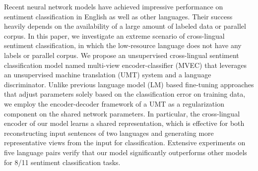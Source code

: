 Recent neural network models have achieved impressive performance on sentiment classification in English as well as other languages. Their success heavily depends on the availability of a large amount of labeled data or parallel corpus. In this paper, we investigate an extreme scenario of cross-lingual sentiment classification, in which the low-resource language does not have any labels or parallel corpus. We propose an unsupervised cross-lingual sentiment classification model named multi-view encoder-classifier (MVEC) that leverages an unsupervised machine translation (UMT) system and a language discriminator. Unlike previous language model (LM) based fine-tuning approaches that adjust parameters solely based on the classification error on training data, we employ the encoder-decoder framework of a UMT as a regularization component on the shared network parameters. In particular, the cross-lingual encoder of our model learns a shared representation, which is effective for both reconstructing input sentences of two languages and generating more representative views from the input for classification. Extensive experiments on five language pairs verify that our model significantly outperforms other models for 8/11 sentiment classification tasks.
